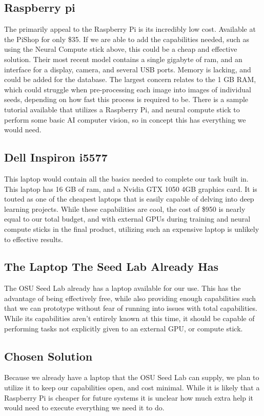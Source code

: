 \documentclass[onecolumn, draftclsnofoot,10pt, compsoc]{IEEEtran}
\begin{document}
\subsection{Raspberry pi}
The primarily appeal to the Raspberry Pi is its incredibly low cost. Available at the PiShop for only \$35.\cite{raspi}  If we are able to add the capabilities needed, such as using the Neural Compute stick above, this could be a cheap and effective solution. Their most recent model contains a single gigabyte of ram, and an interface for a display, camera, and several USB ports. \cite{raspi} Memory is lacking, and could be added for the database. The largest concern relates to the 1 GB RAM, which could struggle when pre-processing each image into images of individual seeds, depending on how fast this process is required to be. There is a sample tutorial available that utilizes a Raspberry Pi, and neural compute stick to perform some basic AI computer vision, so in concept this has everything we would need. \cite{piplusncs}
\subsection{Dell Inspiron i5577}
This laptop would contain all the basics needed to complete our task built in. This laptop has 16 GB of ram, and a Nvidia GTX 1050 4GB graphics card.\cite{laptop} It is touted as one of the cheapest laptops that is easily capable of delving into deep learning projects. \cite{laptop} While these capabilities are cool, the cost of \$950 is nearly equal to our total budget, and with external GPUs during training and neural compute sticks in the final product, utilizing such an expensive laptop is unlikely to effective results.
\subsection{The Laptop The Seed Lab Already Has}
The OSU Seed Lab already has a laptop available for our use. This has the advantage of being effectively free, while also providing enough capabilities such that we can prototype without fear of running into issues with total capabilities. While its capabilities aren't entirely known at this time, it should be capable of performing tasks not explicitly given to an external GPU, or compute stick.
\subsection{Chosen Solution}
Because we already have a laptop that the OSU Seed Lab can supply, we plan to utilize it to keep our capabilities open, and cost minimal. While it is likely that a Raspberry Pi is cheaper for future systems it is unclear how much extra help it would need to execute everything we need it to do.



\end{document}

